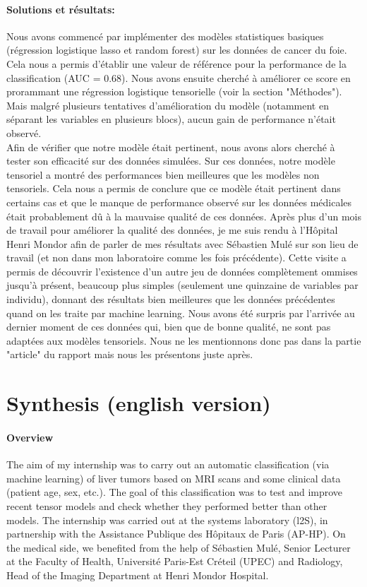 \documentclass[preprint,12pt]{elsarticle}
\begin{document}
\paragraph*{Solutions et résultats:} Nous avons commencé par implémenter des modèles statistiques basiques (régression logistique lasso et random forest) sur les données de cancer du foie. Cela nous a permis d'établir une valeur de référence pour la performance de la classification (AUC = 0.68). Nous avons ensuite cherché à améliorer ce score en prorammant une régression logistique tensorielle (voir la section "Méthodes"). Mais malgré plusieurs tentatives d'amélioration du modèle (notamment en séparant les variables en plusieurs blocs), aucun gain de performance n'était observé.\\
\indent Afin de vérifier que notre modèle était pertinent, nous avons alors cherché à tester son efficacité sur des données simulées. Sur ces données, notre modèle tensoriel a montré des performances bien meilleures que les modèles non tensoriels. Cela nous a permis de conclure que ce modèle était pertinent dans certains cas et que le manque de performance observé sur les données médicales était probablement dû à la mauvaise qualité de ces données. Après plus d'un mois de travail pour améliorer la qualité des données, je me suis rendu à l'Hôpital Henri Mondor afin de parler de mes résultats avec Sébastien Mulé sur son lieu de travail (et non dans mon laboratoire comme les fois précédente). Cette visite a permis de découvrir l'existence d'un autre jeu de données complètement ommises jusqu'à présent, beaucoup plus simples (seulement une quinzaine de variables par individu), donnant des résultats bien meilleures que les données précédentes quand on les traite par machine learning. Nous avons été surpris par l'arrivée au dernier moment de ces données qui, bien que de bonne qualité, ne sont pas adaptées aux modèles tensoriels. Nous ne les mentionnons donc pas dans la partie "article" du rapport mais nous les présentons juste après.\\

\newpage
\section*{Synthesis (english version)}
\vspace*{10 pt}

\paragraph*{Overview} The aim of my internship was to carry out an automatic classification (via machine learning) of liver tumors based on MRI scans and some clinical data (patient age, sex, etc.). The goal of this classification was to test and improve recent tensor models \cite{multi_rank_1,multi_rank_r} and check whether they performed better than other models. The internship was carried out at the systems laboratory (l2S), in partnership with the Assistance Publique des Hôpitaux de Paris (AP-HP). On the medical side, we benefited from the help of Sébastien Mulé, Senior Lecturer at the Faculty of Health, Université Paris-Est Créteil (UPEC) and Radiology, Head of the Imaging Department at Henri Mondor Hospital.
\end{document}
